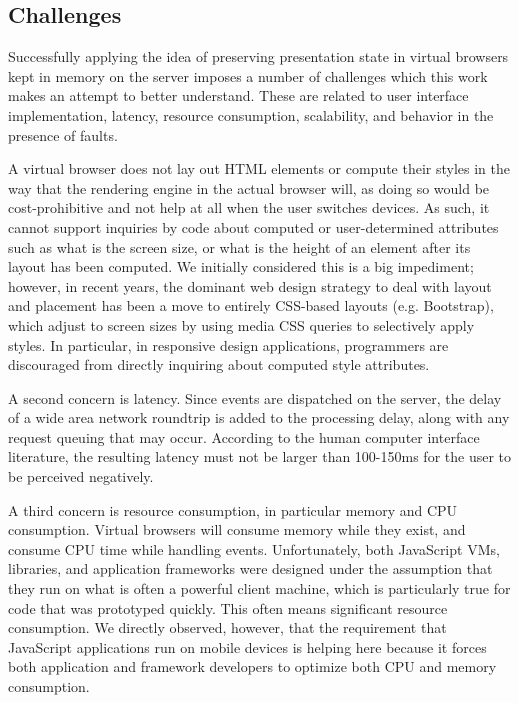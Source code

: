 \subsection{Challenges}
\webscaleout{}
Successfully applying the idea of preserving presentation state in virtual
browsers kept in memory on the server imposes a number of challenges which this work 
makes an attempt to better understand.
These are related to user interface implementation, latency, 
resource consumption, scalability, and behavior in the presence of faults.

A virtual browser does not lay out HTML elements or compute their styles in the
way that the rendering engine in the actual browser will, as doing so would be 
cost-prohibitive and not help at all when the user switches devices.  As such,
it cannot support inquiries by code about computed or user-determined
attributes such as what is the screen size, or what is the height of an
element after its layout has been computed.  We initially considered this is
a big impediment; however, in recent years, the dominant web design strategy
to deal with layout and placement has been a move to entirely CSS-based layouts
(e.g. Bootstrap), which adjust to screen sizes by using media CSS queries
to selectively apply styles.  In particular, in responsive design applications,
programmers are discouraged from directly inquiring about computed style
attributes.

A second concern is latency.  Since events are dispatched on the server,
the delay of a wide area network roundtrip is added to the processing delay,
along with any request queuing that may occur.  According to the human computer
interface literature, the resulting latency must not be larger than 100-150ms 
for the user to be perceived negatively.

A third concern is resource consumption, in particular memory and CPU consumption.
Virtual browsers will consume memory while they exist, and consume CPU time
while handling events.  Unfortunately, both JavaScript VMs, libraries, and
application frameworks were designed under the assumption that they run
on what is often a powerful client machine, which is particularly true for 
code that was prototyped quickly. This often means significant resource 
consumption.  We directly observed, however, that the requirement that JavaScript 
applications run on mobile devices is helping here because it forces both 
application and framework developers to optimize both CPU and memory 
consumption.

